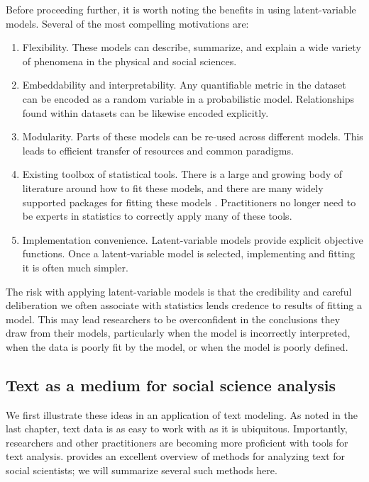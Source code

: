 Before proceeding further, it is worth noting the benefits in using
latent-variable models.  Several of the most compelling motivations are:

\begin{enumerate}
\item Flexibility. These models can describe, summarize, and explain
  a wide variety of phenomena in the physical and social sciences.
\item Embeddability and interpretability.  Any quantifiable metric
  in the dataset can be encoded as a random variable in a
  probabilistic model.  Relationships
  found within datasets can be likewise encoded
  explicitly. \label{lvm:matching}
\item Modularity. Parts of these models can be re-used across
  different models.  This leads to efficient transfer of resources
  and common paradigms.
\item Existing toolbox of statistical tools. There is a large and
  growing body of literature around how to fit these models, and there
  are many widely supported packages for fitting these models
  \cite{bishop:2006}.  Practitioners no longer need to be experts in
  statistics to correctly apply many of these tools.
\item Implementation convenience.  Latent-variable models provide
  explicit objective functions.  Once a latent-variable model is
  selected, implementing and fitting it is often much simpler.
\end{enumerate}

  The risk with applying latent-variable models is that the
  credibility and careful deliberation we often associate with
  statistics lends credence to results of fitting a model.  This may
  lead researchers to be overconfident in the conclusions they draw
  from their models, particularly when the model is incorrectly
  interpreted, when the data is poorly fit by the model, or when the
  model is poorly defined.

\subsection{Text as a medium for social science analysis}
  \label{sec:text_intro}
  We first illustrate these ideas in an application of text modeling.
  As noted in the last chapter, text data is as easy to work with as
  it is ubiquitous. Importantly, researchers and other practitioners
  are becoming more proficient with tools for text analysis.
  \cite{grimmer:submitted} provides an excellent overview of methods
  for analyzing text for social scientists; we will summarize several
  such methods here.

